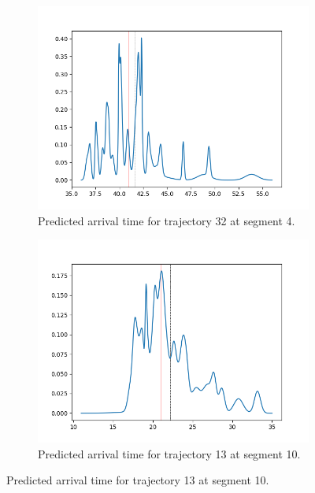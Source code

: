 \begin{figure}
    \centering
    \begin{subfigure}[b]{0.475\textwidth}
        \centering
        \includegraphics[width=\textwidth]{figures/arrival_times/res_5_traj32_seg4}
        \caption[]%
        {{\small Predicted arrival time for trajectory 32 at segment 4.}}    
        \label{fig:result-1}
    \end{subfigure}
    \hfill
    \begin{subfigure}[b]{0.475\textwidth}  
        \centering 
        \includegraphics[width=\textwidth]{figures/arrival_times/res_10_traj13_seg10}
            \caption[]%
            {{\small Predicted arrival time for trajectory 13 at segment 10.}}    

\end{subfigure}
\end{figure}
